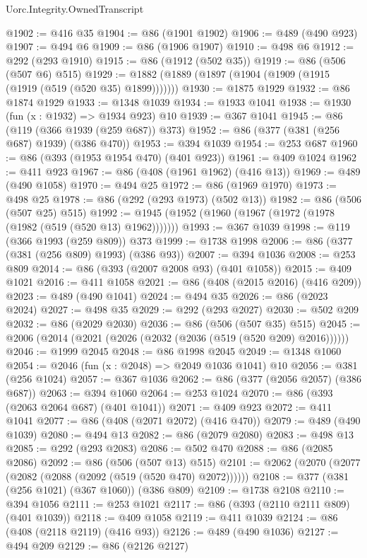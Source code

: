 \begin{lexlean}{Uorc.Integrity.OwnedTranscript}
\begin{coremodule}
@1902 := @416 @35
@1904 := @86 (@1901 @1902)
@1906 := @489 (@490 @923)
@1907 := @494 @6
@1909 := @86 (@1906 @1907)
@1910 := @498 @6
@1912 := @292 (@293 @1910)
@1915 := @86 (@1912 (@502 @35))
@1919 := @86 (@506 (@507 @6) @515)
@1929 := @1882 (@1889 (@1897 (@1904 (@1909 (@1915 (@1919 (@519 (@520 @35) @1899)))))))
@1930 := @1875 @1929
@1932 := @86 @1874 @1929
@1933 := @1348 @1039
@1934 := @1933 @1041
@1938 := @1930 (fun (x : @1932) => @1934 @923) @10
@1939 := @367 @1041
@1945 := @86 (@119 (@366 @1939 (@259 @687)) @373)
@1952 := @86 (@377 (@381 (@256 @687) @1939) (@386 @470))
@1953 := @394 @1039
@1954 := @253 @687
@1960 := @86 (@393 (@1953 @1954 @470) (@401 @923))
@1961 := @409 @1024
@1962 := @411 @923
@1967 := @86 (@408 (@1961 @1962) (@416 @13))
@1969 := @489 (@490 @1058)
@1970 := @494 @25
@1972 := @86 (@1969 @1970)
@1973 := @498 @25
@1978 := @86 (@292 (@293 @1973) (@502 @13))
@1982 := @86 (@506 (@507 @25) @515)
@1992 := @1945 (@1952 (@1960 (@1967 (@1972 (@1978 (@1982 (@519 (@520 @13) @1962)))))))
@1993 := @367 @1039
@1998 := @119 (@366 @1993 (@259 @809)) @373
@1999 := @1738 @1998
@2006 := @86 (@377 (@381 (@256 @809) @1993) (@386 @93))
@2007 := @394 @1036
@2008 := @253 @809
@2014 := @86 (@393 (@2007 @2008 @93) (@401 @1058))
@2015 := @409 @1021
@2016 := @411 @1058
@2021 := @86 (@408 (@2015 @2016) (@416 @209))
@2023 := @489 (@490 @1041)
@2024 := @494 @35
@2026 := @86 (@2023 @2024)
@2027 := @498 @35
@2029 := @292 (@293 @2027)
@2030 := @502 @209
@2032 := @86 (@2029 @2030)
@2036 := @86 (@506 (@507 @35) @515)
@2045 := @2006 (@2014 (@2021 (@2026 (@2032 (@2036 (@519 (@520 @209) @2016))))))
@2046 := @1999 @2045
@2048 := @86 @1998 @2045
@2049 := @1348 @1060
@2054 := @2046 (fun (x : @2048) => @2049 @1036 @1041) @10
@2056 := @381 (@256 @1024)
@2057 := @367 @1036
@2062 := @86 (@377 (@2056 @2057) (@386 @687))
@2063 := @394 @1060
@2064 := @253 @1024
@2070 := @86 (@393 (@2063 @2064 @687) (@401 @1041))
@2071 := @409 @923
@2072 := @411 @1041
@2077 := @86 (@408 (@2071 @2072) (@416 @470))
@2079 := @489 (@490 @1039)
@2080 := @494 @13
@2082 := @86 (@2079 @2080)
@2083 := @498 @13
@2085 := @292 (@293 @2083)
@2086 := @502 @470
@2088 := @86 (@2085 @2086)
@2092 := @86 (@506 (@507 @13) @515)
@2101 := @2062 (@2070 (@2077 (@2082 (@2088 (@2092 (@519 (@520 @470) @2072))))))
@2108 := @377 (@381 (@256 @1021) (@367 @1060)) (@386 @809)
@2109 := @1738 @2108
@2110 := @394 @1056
@2111 := @253 @1021
@2117 := @86 (@393 (@2110 @2111 @809) (@401 @1039))
@2118 := @409 @1058
@2119 := @411 @1039
@2124 := @86 (@408 (@2118 @2119) (@416 @93))
@2126 := @489 (@490 @1036)
@2127 := @494 @209
@2129 := @86 (@2126 @2127)

\end{coremodule}
\end{lexlean}
